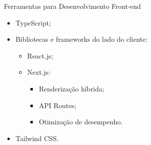 \begin{frame}{Ferramentas para Desenvolvimento Front-end}
    \begin{itemize}
        \item TypeScript; \vspace{0.25cm}
        \item Bibliotecas e frameworks do lado do cliente: \vspace{0.25cm}
              \begin{itemize}
                  \item React.js; \vspace{0.25cm}
                  \item Next.js: \vspace{0.25cm}
                        \begin{itemize}
                            \item Renderização híbrida; \vspace{0.25cm}
                            \item API Routes; \vspace{0.25cm}
                            \item Otimização de desempenho. \vspace{0.25cm}
                        \end{itemize}
              \end{itemize}
        \item Tailwind CSS. \vspace{0.5cm}
    \end{itemize}
\end{frame}

